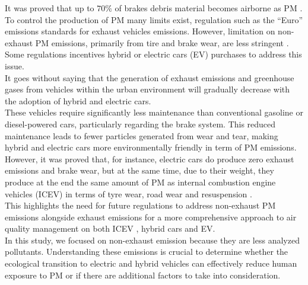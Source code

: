 It was proved that up to $70\%$ of brakes debris material becomes airborne as PM \cite{mulani2022review}.
To control the production of PM many limits exist, regulation such as the “Euro” emissions standards for exhaust vehicles emissions. However, limitation on non-exhaust PM emissions, primarily from tire and brake wear, are less stringent \cite{piscitello2021non}. 
Some regulations incentives hybrid or electric cars (EV) purchases to address this issue. \\
It goes without saying that the generation of exhaust emissions and greenhouse gases from vehicles within the urban environment will gradually decrease with the adoption of hybrid and electric cars. \\
These vehicles require significantly less maintenance than conventional gasoline or diesel-powered cars, particularly regarding the brake system. This reduced maintenance leads to fewer particles generated from wear and tear, making hybrid and electric cars more environmentally friendly in term of PM emissions. \\
However, it was proved that, for instance, electric cars do produce zero exhaust emissions and brake wear, but at the same time, due to their weight, they produce at the end the same amount of PM as internal combustion engine vehicles (ICEV) in terms of tyre wear, road wear and resuspension \cite{timmers2018non}. \\
This highlights the need for future regulations to address non-exhaust PM emissions alongside exhaust emissions for a more comprehensive approach to air quality management on both ICEV , hybrid cars and EV. \\
In this study, we focused on non-exhaust emission because they are less analyzed pollutants. Understanding these emissions is crucial to determine whether the ecological transition to electric and hybrid vehicles can effectively reduce human exposure to PM or if there are additional factors to take into consideration. \\


